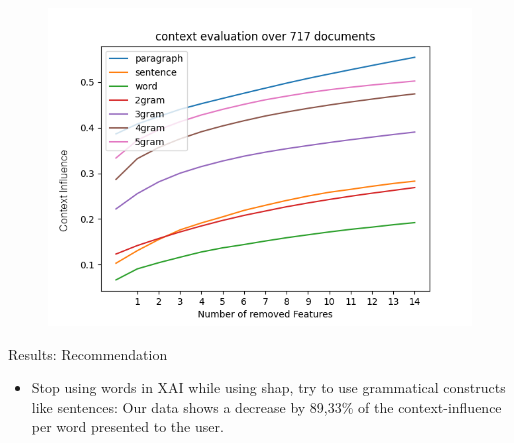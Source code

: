 \documentclass[en]{sdqbeamer}
\begin{document}
\begin{large}

\begin{frame}
    \begin{figure}[H]
        \centering
        \includegraphics[width=\linewidth,height=\textheight,keepaspectratio]{images/clemensEvalPlotAllSelectedDocsCombinedYAXIS.png}
    \end{figure}
\end{frame}


\begin{frame}{Results: Recommendation}
    \begin{itemize}
        \item Stop using words in XAI while using shap, try to use grammatical constructs like sentences: Our data shows a decrease by 89,33\% of the context-influence per word presented to the user.
    \end{itemize}
\end{frame}


\end{large}
\end{document}
